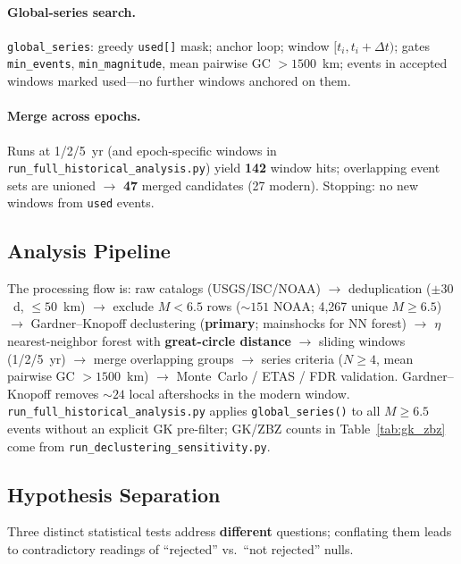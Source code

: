 \documentclass[draft]{agujournal2019}
\begin{document}
\paragraph{Global-series search.}
\texttt{global\_series}: greedy \texttt{used[]} mask; anchor loop;
window $[t_i, t_i+\Delta t)$; gates \texttt{min\_events}, \texttt{min\_magnitude},
mean pairwise GC $> 1500$~km; events in accepted windows marked used---no
further windows anchored on them.

\paragraph{Merge across epochs.}
Runs at 1/2/5~yr (and epoch-specific windows in
\texttt{run\_full\_historical\_analysis.py}) yield \textbf{142} window hits;
overlapping event sets are unioned $\to$ \textbf{47} merged candidates
(27 modern). Stopping: no new windows from \texttt{used} events.

\subsection{Analysis Pipeline}
\label{subsec:pipeline}

The processing flow is:
raw catalogs (USGS/ISC/NOAA) $\to$ deduplication ($\pm 30$~d, $\le 50$~km)
$\to$ exclude $M < 6.5$ rows (${\sim}151$ NOAA; 4{,}267 unique $M \ge 6.5$)
$\to$ Gardner--Knopoff declustering (\textbf{primary}; mainshocks for NN forest)
$\to$ $\eta$ nearest-neighbor forest with \textbf{great-circle distance}
$\to$ sliding windows (1/2/5~yr) $\to$ merge overlapping groups
$\to$ series criteria ($N \ge 4$, mean pairwise GC $> 1500$~km)
$\to$ Monte~Carlo / ETAS / FDR validation.
Gardner--Knopoff removes ${\sim}24$ local aftershocks in the modern window.
\texttt{run\_full\_historical\_analysis.py} applies \texttt{global\_series()}
to all $M \ge 6.5$ events without an explicit GK pre-filter; GK/ZBZ counts
in Table~\ref{tab:gk_zbz} come from \texttt{run\_declustering\_sensitivity.py}.

\subsection{Hypothesis Separation}
\label{subsec:hypothesis-separation}

Three distinct statistical tests address \textbf{different} questions;
conflating them leads to contradictory readings of ``rejected'' vs.\
``not rejected'' nulls.
\end{document}
